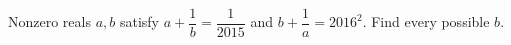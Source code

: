 Nonzero reals $ a,b $ satisfy $ a+\dfrac{1}{b}=\dfrac{1}{2015}$ and $ b+\dfrac{1}{a}=2016^2 $. Find every possible $ b $.
